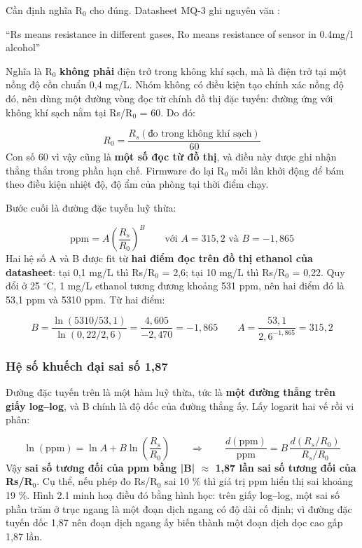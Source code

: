 Cần định nghĩa R$_{0}$ cho đúng. Datasheet MQ-3 ghi nguyên văn \cite{r7}:

\begin{trichdan}
``Rs means resistance in different gases, Ro means resistance of sensor in 0.4mg/l alcohol''
\end{trichdan}
Nghĩa là R$_{0}$ \textbf{không phải} điện trở trong không khí sạch, mà là điện trở tại một nồng độ cồn chuẩn 0,4 mg/L. Nhóm không có điều kiện tạo chính xác nồng độ đó, nên dùng một đường vòng đọc từ chính đồ thị đặc tuyến: đường ứng với không khí sạch nằm tại Rs/R$_{0}$ = 60. Do đó:

\[ R_0 = \frac{R_s(\text{đo trong không khí sạch})}{60} \]
Con số 60 vì vậy cũng là \textbf{một số đọc từ đồ thị}, và điều này được ghi nhận thẳng thắn trong phần hạn chế. Firmware đo lại R$_{0}$ mỗi lần khởi động để bám theo điều kiện nhiệt độ, độ ẩm của phòng tại thời điểm chạy.

Bước cuối là đường đặc tuyến luỹ thừa:

\[ \text{ppm} = A\left(\frac{R_s}{R_0}\right)^{\!B} \qquad\text{với } A = 315{,}2 \text{ và } B = -1{,}865 \]
Hai hệ số A và B được fit từ \textbf{hai điểm đọc trên đồ thị ethanol của datasheet}: tại 0,1 mg/L thì Rs/R$_{0}$ = 2,6; tại 10 mg/L thì Rs/R$_{0}$ = 0,22. Quy đổi ở 25 $^\circ$C, 1 mg/L ethanol tương đương khoảng 531 ppm, nên hai điểm đó là 53,1 ppm và 5310 ppm. Từ hai điểm:

\[ B = \frac{\ln(5310/53{,}1)}{\ln(0{,}22/2{,}6)} = \frac{4{,}605}{-2{,}470} = -1{,}865 \qquad A = \frac{53{,}1}{2{,}6^{-1,865}} = 315{,}2 \]

\subsubsection{Hệ số khuếch đại sai số 1,87}
Đường đặc tuyến trên là một hàm luỹ thừa, tức là \textbf{một đường thẳng trên giấy log--log}, và B chính là độ dốc của đường thẳng ấy. Lấy logarit hai vế rồi vi phân:

\[ \ln(\text{ppm}) = \ln A + B\ln\!\left(\frac{R_s}{R_0}\right) \qquad\Longrightarrow\qquad \frac{d(\text{ppm})}{\text{ppm}} = B\,\frac{d(R_s/R_0)}{R_s/R_0} \]
Vậy \textbf{sai số tương đối của ppm bằng |B| $\approx$ 1,87 lần sai số tương đối của Rs/R$_{0}$}. Cụ thể, nếu phép đo Rs/R$_{0}$ sai 10 \% thì giá trị ppm hiển thị sai khoảng 19 \%. Hình 2.1 minh hoạ điều đó bằng hình học: trên giấy log--log, một sai số phần trăm ở trục ngang là một đoạn dịch ngang có độ dài cố định; vì đường đặc tuyến dốc 1,87 nên đoạn dịch ngang ấy biến thành một đoạn dịch dọc cao gấp 1,87 lần.

